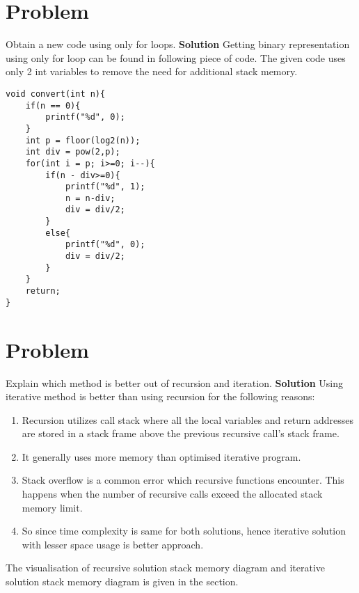 \documentclass[journal,12pt,twocolumn]{IEEEtran}
\begin{document}
\section{Problem}
Obtain a new code using only for loops.
\newline
\textbf{Solution}
\newline
Getting binary representation using only for loop can be found in following piece of code.
The given code uses only 2 int variables to remove the need for additional stack memory.
\newpage
\begin{lstlisting}
void convert(int n){
    if(n == 0){
        printf("%d", 0);
    }
    int p = floor(log2(n));
    int div = pow(2,p);
    for(int i = p; i>=0; i--){
        if(n - div>=0){
            printf("%d", 1);
            n = n-div;
            div = div/2;
        }
        else{
            printf("%d", 0);
            div = div/2;
        }
    }
    return;
}
\end{lstlisting}
\setcounter{figure}{0}

\section{Problem}
Explain which method is better out of recursion and iteration.
\newline
\textbf{Solution}
\newline
Using iterative method is better than using recursion for the following reasons:
\begin{enumerate}
  \item Recursion utilizes call stack where all the local variables and return addresses are stored in a stack frame above the previous recursive call's stack frame.
  \item It generally uses more memory than optimised iterative program.
  \item Stack overflow is a common error which recursive functions encounter. This happens when the number of recursive calls exceed the allocated stack memory limit.
  \item So since time complexity is same for both solutions, hence iterative solution with lesser space usage is better approach.
\end{enumerate}
The visualisation of recursive solution stack memory diagram and iterative solution stack memory diagram is given in the 
 section.

\newpage
\end{document}
